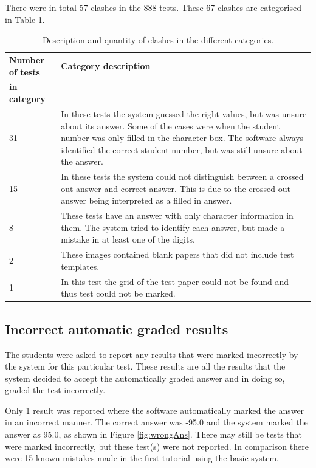 There were in total 57 clashes in the 888 tests. These 67 clashes are categorised in Table  \ref{tbl:TutClash}.
\begin{table}
  \centering
  \caption{Description and quantity of clashes in the different categories.} \label{tbl:TutClash}
\begin{tabular}{|p{3cm}|p{8cm}|}
\hline
\textbf{Number of tests} & \textbf{Category description}\\
\textbf{in category} &\\
\hline
31&In these tests the system guessed the right values, but was unsure about its answer. Some of the cases were when the student number was only filled in the character box. The software always identified the correct student number, but was still unsure about the answer.\\
\hline
15&In these tests the system could not distinguish between a crossed out answer and correct answer. This is due to the crossed out answer being interpreted as a filled in answer.\\
\hline
8&These tests have an answer with only character information in them. The system tried to identify each answer, but made a mistake in at least one of the digits.\\
\hline
2&These images contained blank papers that did not include test templates.\\
\hline
1&In this test the grid of the test paper could not be found and thus test could not be marked.\\
\hline
\end{tabular}
\end{table}

\subsection{Incorrect automatic graded results}

The students were asked to report any results that were marked incorrectly by the system for this particular test. These results are all the results that the system decided to accept the automatically graded answer and in doing so, graded the test incorrectly.

Only 1 result was reported where the software automatically marked the answer in an incorrect manner. The correct answer was -95.0 and the system marked the answer as 95.0, as shown in Figure \ref{fig:wrongAns}. There may still be tests that were marked incorrectly, but these test(s) were not reported. In comparison there were 15 known mistakes made in the first tutorial using the basic system.

